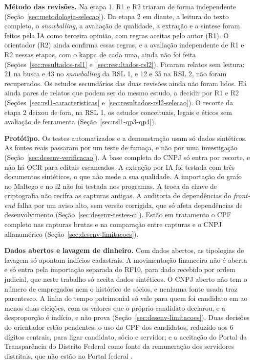 \textbf{Método das revisões.} Na etapa 1, R1 e R2 triaram de forma
independente (Seção~\ref{sec:metodologia-selecao}). Da etapa 2 em diante, a
leitura do texto completo, o \textit{snowballing}, a avaliação de qualidade,
a extração e a síntese foram feitos pela IA como terceira opinião, com regras
aceitas pelo autor (R1). O orientador (R2) ainda confirma essas regras, e a
avaliação independente de R1 e R2 nessas etapas, com o kappa de cada uma,
ainda não foi feita (Seções~\ref{sec:resultados-rsl1}
e~\ref{sec:resultados-rsl2}). Ficaram relatos sem leitura: 21 na busca e 43
no \textit{snowballing} da RSL 1, e 12 e 35 na RSL 2, não foram recuperados.
Os estudos secundários das duas revisões ainda não foram lidos. Há ainda
pares de relatos que podem ser do mesmo estudo, a decidir por R1 e R2
(Seções~\ref{sec:rsl1-caracteristicas}
e~\ref{sec:resultados-rsl2-selecao}). O recorte da etapa 2 deixou de fora,
na RSL 1, os estudos conceituais, legais e éticos sem avaliação de
ferramenta (Seção~\ref{sec:rsl1-qp3-qp4}).

\textbf{Protótipo.} Os testes automatizados e a demonstração usam só dados
sintéticos. As fontes reais passaram por um teste de fumaça, e não por uma
investigação (Seção~\ref{sec:desenv-verificacao}). A base completa do CNPJ
só entra por recorte, e não há OCR para editais escaneados. A extração por
IA foi testada com três documentos sintéticos, o que não mede a sua
qualidade. A importação do grafo no Maltego e no i2 não foi testada nos
programas. A troca da chave de criptografia não recifra as capturas antigas.
A auditoria de dependências do \textit{front-end} falha por um aviso alto,
sem versão corrigida, que só afeta dependências de desenvolvimento
(Seção~\ref{sec:desenv-testes-ci}). Estão em
tratamento o CPF completo nas capturas brutas e na comparação entre capturas
e o CNPJ alfanumérico (Seção~\ref{sec:desenv-limitacoes}).

\textbf{Dados abertos e lavagem de dinheiro.} Com dados abertos, as
tipologias de lavagem só apontam indícios cadastrais. A movimentação
financeira não é aberta e só entra pela importação separada do RF10, para
dado recebido por ordem judicial, que neste trabalho só aceita dados
sintéticos. O CNPJ aberto não tem o número de empregados nem o histórico de
sócios, e nenhuma fonte usada traz parentesco. A linha do tempo patrimonial
só vale para quem foi candidato em ao menos duas eleições, com os valores
que o próprio candidato declarou, e a desproporção é indício, e não prova
(Seção~\ref{sec:desenv-limitacoes}). Duas decisões do orientador estão
pendentes: o uso do CPF dos candidatos, reduzido aos 6 dígitos centrais,
para ligar candidato, sócio e servidor; e a aceitação do Portal da
Transparência do Distrito Federal como fonte da remuneração dos servidores
distritais, que não estão no Portal federal \cite{dfportalremuneracao}.


